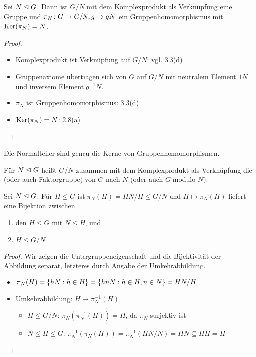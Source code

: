 %
\begin{satz}
	Sei $N \trianglelefteq G$. Dann ist $G/N$ mit dem Komplexprodukt als Verknüpfung eine Gruppe und $\pi_N \colon G \to G/N, g \mapsto gN$ ein Gruppenhomomorphismus mit $\operatorname{Ker}(\pi_N)=N$.
\end{satz}
\begin{proof}
	\begin{itemize}
		\item Komplexprodukt ist Verknüpfung auf $G/N$: vgl. 3.3(d)
		\item Gruppenaxiome übertragen sich von $G$ auf $G/N$ mit neutralem Element $1N$ und inversem Element $g^{-1}N$.
		\item $\pi_N$ ist Gruppenhomomorphismus: 3.3(d)
		\item $\operatorname{Ker}(\pi_N) = N$: 2.8(a)
	\end{itemize}
\end{proof}
%
\begin{kor}
	Die Normalteiler sind genau die Kerne von Gruppenhomomorphismen.
\end{kor}
%
\begin{defin}
	Für $N \trianglelefteq G$ heißt $G/N$ zusammen mit dem Komplexprodukt als Verknüpfung die  (oder auch Faktorgruppe) von $G$ nach $N$ (oder auch $G$ modulo $N$).
\end{defin}
%
\begin{lemma}
	Sei $N \trianglelefteq G$. Für $H \leq G$ ist $\pi_N(H) = HN / H \leq G/N$ und $H \mapsto \pi_N(H)$ liefert eine Bijektion zwischen
	\begin{enumerate}
		\item den $H \leq G$ mit $N \leq H$, und
		\item $H \leq G/N$
	\end{enumerate}
\end{lemma}
\begin{proof}
	Wir zeigen die Untergruppeneigenschaft und die Bijektivität der Abbildung separat, letzteres durch Angabe der Umkehrabbildung.
	\begin{itemize}
		\item $\pi_N(H) = \{ hN : h \in H \} = \{ hnN : h \in H, n \in N \} = HN/H$
		\item Umkehrabbildung: $H \mapsto \pi_N^{-1}(H)$
		\begin{itemize}
			\item[] $H \leq G/N$: \hspace{5mm} $\pi_N(\pi_N^{-1}(H)) = H$, da $\pi_N$ surjektiv ist
			\item[] $N \leq H \leq G$: \hspace{1.5mm} $\pi_N^{-1}(\pi_N(H)) = \pi_N^{-1}(HN/N) = HN \subseteq HH = H$ 
		\end{itemize}
	\end{itemize}
\end{proof}
